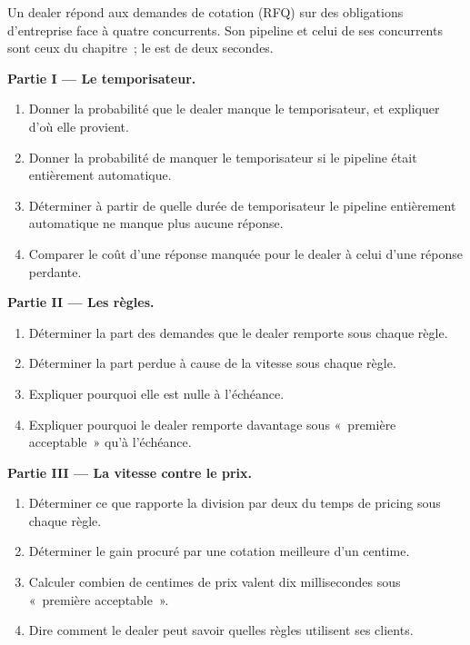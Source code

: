 \begin{problem}\label{pb:nw:fixed-income-and-rfq-platform-connectivity:1}
Un dealer répond aux demandes de cotation (RFQ) sur des obligations d'entreprise face à quatre concurrents. Son pipeline et celui de ses concurrents sont ceux du chapitre~; le
 est de deux secondes.

\medskip\noindent\textbf{Partie I --- Le temporisateur.}
\begin{enumerate}
\item Donner la probabilité que le dealer manque le temporisateur, et expliquer d'où elle provient.
\item Donner la probabilité de manquer le temporisateur si le pipeline était entièrement automatique.
\item Déterminer à partir de quelle durée de temporisateur le pipeline entièrement automatique ne manque plus aucune réponse.
\item Comparer le coût d'une réponse manquée pour le dealer à celui d'une réponse perdante.
\end{enumerate}

\medskip\noindent\textbf{Partie II --- Les règles.}
\begin{enumerate}[resume]
\item Déterminer la part des demandes que le dealer remporte sous chaque règle.
\item Déterminer la part perdue à cause de la vitesse sous chaque règle.
\item Expliquer pourquoi elle est nulle à l'échéance.
\item Expliquer pourquoi le dealer remporte davantage sous «~première acceptable~» qu'à l'échéance.
\end{enumerate}

\medskip\noindent\textbf{Partie III --- La vitesse contre le prix.}
\begin{enumerate}[resume]
\item Déterminer ce que rapporte la division par deux du temps de pricing sous chaque règle.
\item Déterminer le gain procuré par une cotation meilleure d'un centime.
\item Calculer combien de centimes de prix valent dix millisecondes sous «~première acceptable~».
\item Dire comment le dealer peut savoir quelles règles utilisent ses clients.
\end{enumerate}


\end{problem}
